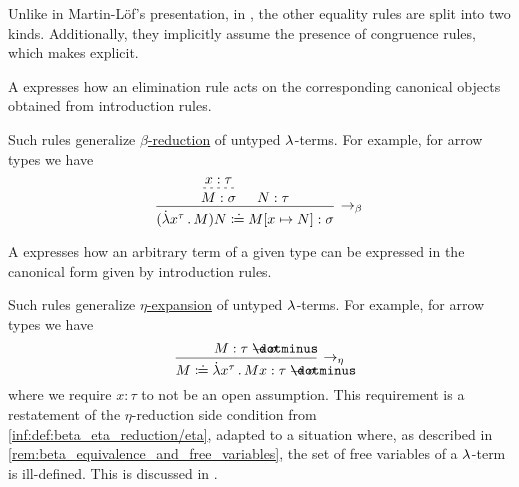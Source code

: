 \begin{remark}
\begin{thmenum}
    Unlike in Martin-L\"of's presentation, in \cite[27]{UnivalentFoundationsProgram2024OctoberHoTT}, the other equality rules are split into two kinds. Additionally, they implicitly assume the presence of congruence rules, which  makes explicit.

    \begin{thmenum}
       A  expresses how an elimination rule acts on the corresponding canonical objects obtained from introduction rules.

      Such rules generalize \hyperref[def:beta_eta_reduction]{\( \beta \)-reduction} of untyped \( {\mathrm \lambda} \)-terms. For example, for arrow types we have
      \begin{equation*}
        \begin{prooftree}
          \hypo{ x: \tau }
          \infer[dashed]1{ M: \sigma }

          \hypo{ N: \tau }
          \infer2[\ensuremath{ \rightarrow_\beta }]{ (\qabs {x^\tau} M) N \syndefeq M[x \mapsto N]: \sigma }.
        \end{prooftree}
      \end{equation*}

       A  expresses how an arbitrary term of a given type can be expressed in the canonical form given by introduction rules.

      Such rules generalize \hyperref[def:beta_eta_reduction]{\( \eta \)-expansion} of untyped \( {\mathrm \lambda} \)-terms. For example, for arrow types we have
      \begin{equation*}
        \begin{prooftree}
          \hypo{ M: \tau \synimplies \sigma }
          \infer1[\ensuremath{ \rightarrow_\eta }]{ M \syndefeq \qabs {x^\tau} M x: \tau \synimplies \sigma },
        \end{prooftree}
      \end{equation*}
      where we require \( x: \tau \) to not be an open assumption. This requirement is a restatement of the \( \eta \)-reduction side condition from \ref{inf:def:beta_eta_reduction/eta}, adapted to a situation where, as described in \cref{rem:beta_equivalence_and_free_variables}, the set of free variables of a \( {\mathrm \lambda} \)-term is ill-defined. This is discussed in \cite{MathSE:dependent_type_theory_and_free_variables}.


\end{thmenum}
\end{thmenum}
\end{remark}
